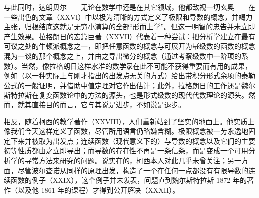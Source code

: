 与此同时，达朗贝尔——无论在数学中还是在其它领域，他都敌视一切玄奥——在一些出色的文章（XXVI）中以极为清晰的方式定义了极限和导数的概念，并竭力主张，归根结底这就是无穷小演算的全部“形而上学”。但这一明智的忠告并未立即产生效果。拉格朗日的宏篇巨著（XXVII）代表着一种尝试：把分析学建立在最有可议之处的牛顿派概念之一，即把任意函数的概念与可展开为幂级数的函数的概念混为一谈的那个概念之上，并由之导出微分的概念（通过考察级数中一阶项的系数）。当然，像拉格朗日这样水准的数学家在此不可能不获得重要而有用的成果，例如（以一种实际上与刚才指出的出发点无关的方式）给出带积分形式余项的泰勒公式的一般证明，并借助中值定理对它作出估计；此外，拉格朗日的工作还是魏尔斯特拉斯在复变函数论中的方法的源头，也是形式级数的现代代数理论的源头。然而，就其直接目的而言，它与其说是进步，不如说是退步。

相反，随着柯西的教学著作（XXVIII），人们重新站到了坚实的地面上。他实质上像我们今天这样定义了函数，尽管所用语言仍略嫌含糊。极限概念被一劳永逸地固定下来并被取为出发点；连续函数（现代意义下的）与导数的概念以及它们的主要初等性质都由之立即导出；而导数的存在性不再是一条信条，而是变成一个可用分析学的寻常方法来研究的问题。说实在的，柯西本人对此几乎未曾关注；另一方面，尽管波尔查诺从同样的原理出发，构造了一个在任何一点都没有有限导数的连续函数的例子（XXIX），这个例子并未发表，问题直到魏尔斯特拉斯 1872 年的著作（以及他 1861 年的课程）才得到公开解决（XXXII）。

